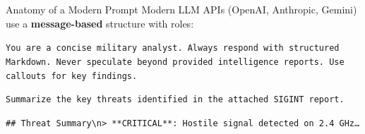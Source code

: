 \documentclass{beamer}
\begin{document}
\begin{frame}{Anatomy of a Modern Prompt}
    Modern LLM APIs (OpenAI, Anthropic, Gemini) use a \textbf{message-based} structure with roles:

    \vspace{0.3cm}
    \begin{tcolorbox}[colback=systembg, colframe=blue!50, title={\small \textbf{System} (defines persona, rules, tools)}, fonttitle=\small]
        \scriptsize
        \texttt{You are a concise military analyst. Always respond with structured Markdown.
        Never speculate beyond provided intelligence reports. Use callouts for key findings.}
    \end{tcolorbox}

    \begin{tcolorbox}[colback=userbg, colframe=green!50, title={\small \textbf{User} (the task or question)}, fonttitle=\small]
        \scriptsize
        \texttt{Summarize the key threats identified in the attached SIGINT report.}
    \end{tcolorbox}

    \begin{tcolorbox}[colback=assistantbg, colframe=orange!50, title={\small \textbf{Assistant} (prior model turn --- few-shot anchor)}, fonttitle=\small]
        \scriptsize
        \texttt{## Threat Summary\textbackslash n> **CRITICAL**: Hostile signal detected on 2.4 GHz\ldots}
    \end{tcolorbox}

\end{frame}
\end{document}
